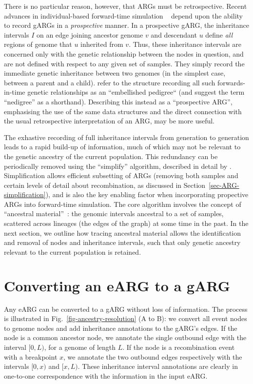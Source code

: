 \documentclass{article}
\begin{document}
There is no particular reason, however, that ARGs must be
retrospective. Recent advances in individual-based forward-time simulation
~\citep{kelleher2018efficient,haller2018tree} depend upon the ability to
record gARGs in a \emph{prospective} manner.
In a prospective gARG, the inheritance intervals $I$
on an edge joining ancestor genome $v$ and descendant $u$
define \emph{all} regions of genome that $u$ inherited from $v$.
Thus, these inheritance intervals are
concerned only with the genetic relationship
between the nodes in question, and are not defined with respect
to any given set of samples. They simply record the immediate
genetic inheritance between two genomes
(in the simplest case, between a parent and a child).
\citet{kelleher2018efficient} refer to the structure
recording all such forwards-in-time genetic relationships
as an ``embellished pedigree`` (and suggest the term ``nedigree'' as a shorthand).
Describing this instead as a ``prospective ARG'', emphasising
the use of the same data structures and the direct connection with
the usual retrospective interpretation of an ARG, may be
more useful.

The exhastive recording of full inheritance intervals from generation
to generation leads to a rapid build-up of information, much of which
may not be relevant to the genetic ancestry of the current population.
This redundancy can be periodically removed using the ``simplify'' algorithm,
described in detail by \citet{kelleher2018efficient}. Simplification
allows efficient subsetting of ARGs (removing both samples and certain
levels of detail about recombination, as discussed in Section~\ref{sec-ARG-simplification}),
and is also the key enabling factor when incorporating propective ARGs into
forward-time simulation.
The core algorithm involves the concept of
``ancestral material''~\citep{wiuf1999ancestry,wiuf1999recombination}:
the genomic intervals ancestral to a set of samples,
scattered across lineages (the edges of the graph)
at some time in the past. In the next section, we outline how
tracing ancestral material allows the identification and removal of nodes
and inheritance intervals, such that
only genetic ancestry relevant to the current population is retained.

\section{Converting an eARG to a gARG}
\label{sec-eARG-to-gARG}
Any eARG can be converted to a gARG without loss of information.
The process is illustrated in Fig.~\ref{fig-ancestry-resolution} (A to B):
we convert all event nodes to genome nodes and add inheritance annotations
to the gARG's edges. If the node is a common ancestor node,
we annotate the single outbound edge with the interval $[0,L)$,
for a genome of length $L$.
If the node is a recombination event with a breakpoint $x$,
we annotate the two outbound edges respectively with the intervals $[0, x)$ and $[x, L)$.
These inheritance interval annotations are clearly in one-to-one
correspondence with the information in the input eARG.
\end{document}
